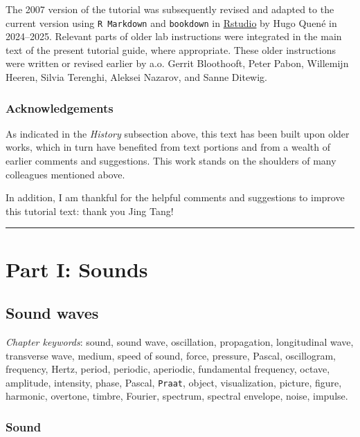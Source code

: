 \documentclass[
]{book}
\begin{document}
The 2007 version of the tutorial was subsequently revised and adapted to the current version using \texttt{R\ Markdown} \citep{rmarkdown2018} and \texttt{bookdown} \citep{R-bookdown} in \href{https://www.rstudio.com}{Rstudio} by Hugo Quené in 2024--2025. Relevant parts of older lab instructions were integrated in the main text of the present tutorial guide, where appropriate. These older instructions were written or revised earlier by a.o. Gerrit Bloothooft, Peter Pabon, Willemijn Heeren, Silvia Terenghi, Aleksei Nazarov, and Sanne Ditewig.

\section*{Acknowledgements}\label{acknowledgements}

As indicated in the \emph{History} subsection above, this text has been built upon older works, which in turn have benefited from text portions and from a wealth of earlier comments and suggestions. This work stands on the shoulders of many colleagues mentioned above.

In addition, I am thankful for the helpful comments and suggestions to improve this tutorial text: thank you Jing Tang!

\begin{center}\rule{0.5\linewidth}{0.5pt}\end{center}

\part*{Part I: Sounds}\label{part-part-i-sounds}

\chapter{Sound waves}\label{ch-soundwaves}

\emph{Chapter keywords}: sound, sound wave, oscillation, propagation, longitudinal wave, transverse wave, medium, speed of sound, force, pressure, Pascal, oscillogram, frequency, Hertz, period, periodic, aperiodic, fundamental frequency, octave, amplitude, intensity, phase, Pascal, \texttt{Praat}, object, visualization, picture, figure, harmonic, overtone, timbre, Fourier, spectrum, spectral envelope, noise, impulse.

\section{Sound}\label{sound}
\end{document}
